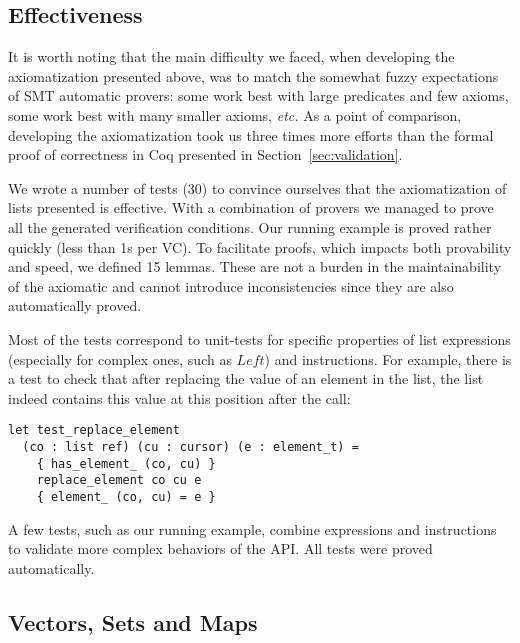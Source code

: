 \documentclass[runningheads,a4paper]{llncs}
\newcommand{\etc}{\textit{etc.}\xspace}
\newcommand{\Left}{\ensuremath{\mathit{Left}}\xspace}
\newcommand{\beforesub}{\vspace{-0.2cm}}
\newcommand{\aftersub}{\vspace{-0.1cm}}
\begin{document}
\beforesub
\subsection{Effectiveness}
\aftersub

It is worth noting that the main difficulty we faced, when developing the
axiomatization presented above, was to match the somewhat fuzzy expectations of
SMT automatic provers: some work best with large predicates and few axioms,
some work best with many smaller axioms, \etc
\ifdefined\longversion
 As a point of comparison,
developing the axiomatization took us three times more efforts than the formal
proof of correctness in Coq presented in Section~\ref{sec:validation}.
\fi

We wrote a number of tests (30) to convince ourselves that the axiomatization
of lists presented is effective. With a combination of provers we managed to
prove all the generated verification conditions. Our running example is proved
rather quickly (less than 1s per VC). To facilitate proofs, which impacts both
provability and speed, we defined 15 lemmas. These are not a burden in the
maintainability of the axiomatic and cannot introduce inconsistencies since
they are also automatically proved.

Most of the tests correspond to unit-tests for specific properties of list
expressions (especially for complex ones, such as $\Left$) and instructions.
For example, there is a test to check that after replacing the value of an
element in the list, the list indeed contains this value at this position after
the call:
\begin{lstlisting}
let test_replace_element
  (co : list ref) (cu : cursor) (e : element_t) =
    { has_element_ (co, cu) }
    replace_element co cu e
    { element_ (co, cu) = e }
\end{lstlisting}
A few tests, such as our running example, combine expressions and instructions
to validate more complex behaviors of the API. All tests were proved
automatically.

\beforesub
\subsection{Vectors, Sets and Maps}
\aftersub
\end{document}
